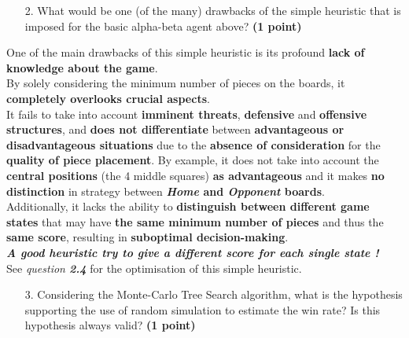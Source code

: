 \documentclass[11pt,a4paper]{report}
\begin{document}
\begin{enumerate}
\item[2.] What would be one (of the many) drawbacks of the simple heuristic that is imposed for the basic alpha-beta agent above? \textbf{(1 point)}
\end{enumerate}

\begin{answers}[10cm]
One of the main drawbacks of this simple heuristic is its profound \textbf{lack of knowledge about the game}. \\

By solely considering the minimum number of pieces on the boards, it \textbf{completely overlooks crucial aspects}. \\

It fails to take into account \textbf{imminent threats}, \textbf{defensive} and \textbf{offensive structures}, and \textbf{does not differentiate} between \textbf{advantageous or disadvantageous situations} due to the \textbf{absence of consideration} for the \textbf{quality of piece placement}.
By example, it does not take into account the \textbf{central positions} (the 4 middle squares) \textbf{as advantageous} and it makes \textbf{no distinction} in strategy between \textbf{\textit{Home} and \textit{Opponent} boards}. \\

Additionally, it lacks the ability to \textbf{distinguish between different game states} that may have \textbf{the same minimum number of pieces} and thus the \textbf{same score}, resulting in \textbf{suboptimal decision-making}. \\

\textbf{\textit{A good heuristic try to give a different score for each single state !}} \\

See \textit{question \textbf{2.4}} for the optimisation of this simple heuristic.
\end{answers}


\begin{enumerate}
\item[3.] Considering the Monte-Carlo Tree Search algorithm, what is the hypothesis supporting the use of random simulation to estimate the win rate? Is this hypothesis always valid? \textbf{(1 point)}
\end{enumerate}
\end{document}
